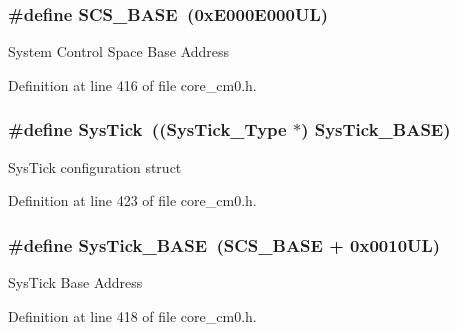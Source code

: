 \subsubsection[{\texorpdfstring{S\+C\+S\+\_\+\+B\+A\+SE}{SCS_BASE}}]{\setlength{\rightskip}{0pt plus 5cm}\#define S\+C\+S\+\_\+\+B\+A\+SE~(0x\+E000\+E000\+U\+L)}\hypertarget{group___c_m_s_i_s__core__register_ga3c14ed93192c8d9143322bbf77ebf770}{}\label{group___c_m_s_i_s__core__register_ga3c14ed93192c8d9143322bbf77ebf770}
System Control Space Base Address 

Definition at line 416 of file core\+\_\+cm0.\+h.

\subsubsection[{\texorpdfstring{Sys\+Tick}{SysTick}}]{\setlength{\rightskip}{0pt plus 5cm}\#define Sys\+Tick~(({\bf Sys\+Tick\+\_\+\+Type} $\ast$)       {\bf Sys\+Tick\+\_\+\+B\+A\+SE})}\hypertarget{group___c_m_s_i_s__core__register_gacd96c53beeaff8f603fcda425eb295de}{}\label{group___c_m_s_i_s__core__register_gacd96c53beeaff8f603fcda425eb295de}
Sys\+Tick configuration struct 

Definition at line 423 of file core\+\_\+cm0.\+h.

\subsubsection[{\texorpdfstring{Sys\+Tick\+\_\+\+B\+A\+SE}{SysTick_BASE}}]{\setlength{\rightskip}{0pt plus 5cm}\#define Sys\+Tick\+\_\+\+B\+A\+SE~({\bf S\+C\+S\+\_\+\+B\+A\+SE} +  0x0010\+U\+L)}\hypertarget{group___c_m_s_i_s__core__register_ga58effaac0b93006b756d33209e814646}{}\label{group___c_m_s_i_s__core__register_ga58effaac0b93006b756d33209e814646}
Sys\+Tick Base Address 

Definition at line 418 of file core\+\_\+cm0.\+h.


